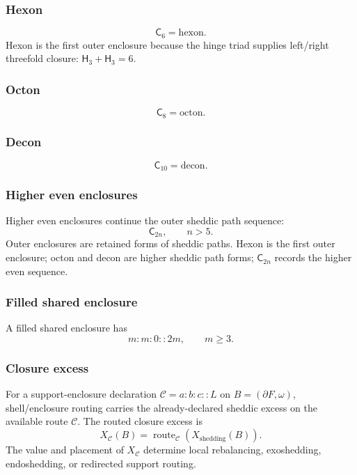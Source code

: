 \subsubsection{Hexon}\label{subsec:hexon}
\[
\mathsf C_6=\mathrm{hexon}.
\]
Hexon is the first outer enclosure because the hinge triad supplies left/right threefold closure: \(\mathsf H_3+\mathsf H_3=6\).

\subsubsection{Octon}\label{subsec:octon}
\[
\mathsf C_8=\mathrm{octon}.
\]

\subsubsection{Decon}\label{subsec:decon}
\[
\mathsf C_{10}=\mathrm{decon}.
\]

\subsubsection{Higher even enclosures}\label{subsec:higher-even-enclosures}
Higher even enclosures continue the outer sheddic path sequence:
\[
\mathsf C_{2n},
\qquad n>5.
\]
Outer enclosures are retained forms of sheddic paths. Hexon is the first outer enclosure; octon and decon are higher sheddic path forms; \(\mathsf C_{2n}\) records the higher even sequence.

\subsubsection{Filled shared enclosure}\label{subsec:filled-shared-enclosures}
A filled shared enclosure has
\[
m:m:0::2m,
\qquad m\ge3.
\]
\subsubsection{Closure excess}\label{subsec:support-enclosure-sadar-closure}
For a support-enclosure declaration \(\mathcal C=a:b:c::L\) on \(B=(\partial F,\omega)\), shell/enclosure routing carries the already-declared sheddic excess on the available route \(\mathcal C\). The routed closure excess is
\begin{equation}
X_{\mathcal C}(B)
=
\operatorname{route}_{\mathcal C}\!\left(X_{\mathrm{shedding}}(B)\right).
\label{eq:support-enclosure-excess}
\end{equation}
The value and placement of \(X_{\mathcal C}\) determine local rebalancing, exoshedding, endoshedding, or redirected support routing.


